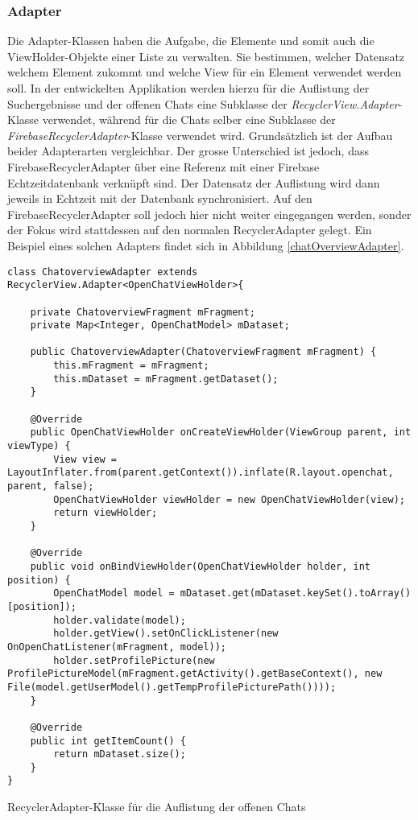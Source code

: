 \documentclass[../main.tex]{subfiles}
\begin{document}
	\subsubsection{Adapter}
	Die Adapter-Klassen haben die Aufgabe, die Elemente und somit auch die ViewHolder-Objekte einer Liste zu verwalten. Sie bestimmen, welcher Datensatz welchem Element zukommt und welche View für ein Element verwendet werden soll. In der entwickelten Applikation werden hierzu für die Auflistung der Suchergebnisse und der offenen Chats eine Subklasse der \emph{RecyclerView.Adapter}-Klasse verwendet, während für die Chats selber eine Subklasse der \emph{FirebaseRecyclerAdapter}-Klasse verwendet wird. Grundsätzlich ist der Aufbau beider Adapterarten vergleichbar. Der grosse Unterschied ist jedoch, dass FirebaseRecyclerAdapter über eine Referenz mit einer Firebase Echtzeitdatenbank verknüpft sind. Der Datensatz der Auflistung wird dann jeweils in Echtzeit mit der Datenbank synchronisiert. Auf den FirebaseRecyclerAdapter soll jedoch hier nicht weiter eingegangen werden, sonder der Fokus wird stattdessen auf den normalen RecyclerAdapter gelegt. Ein Beispiel eines solchen Adapters findet sich in Abbildung \ref{chatOverviewAdapter}.
	
\begin{code}
	\begin{center}
		\begin{verbatim}
class ChatoverviewAdapter extends RecyclerView.Adapter<OpenChatViewHolder>{

	private ChatoverviewFragment mFragment;
	private Map<Integer, OpenChatModel> mDataset;

	public ChatoverviewAdapter(ChatoverviewFragment mFragment) {
		this.mFragment = mFragment;
		this.mDataset = mFragment.getDataset();
	}

	@Override
	public OpenChatViewHolder onCreateViewHolder(ViewGroup parent, int viewType) {
		View view = LayoutInflater.from(parent.getContext()).inflate(R.layout.openchat, parent, false);
		OpenChatViewHolder viewHolder = new OpenChatViewHolder(view);
		return viewHolder;
	}

	@Override
	public void onBindViewHolder(OpenChatViewHolder holder, int position) {
		OpenChatModel model = mDataset.get(mDataset.keySet().toArray()[position]);
		holder.validate(model);
		holder.getView().setOnClickListener(new OnOpenChatListener(mFragment, model));
		holder.setProfilePicture(new ProfilePictureModel(mFragment.getActivity().getBaseContext(), new File(model.getUserModel().getTempProfilePicturePath())));
	}

	@Override
	public int getItemCount() {
		return mDataset.size();
	}
}
		\end{verbatim}
		\caption{RecyclerAdapter-Klasse für die Auflistung der offenen Chats}
		\label{chatOverviewAdapter}
	\end{center}
\end{code}
\end{document}
